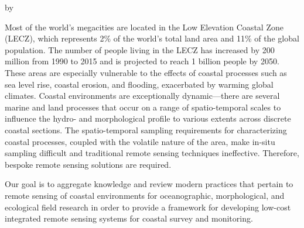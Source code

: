 \documentclass{article}
\begin{document}

\newpage
{}
\thispagestyle{fancy}
\begin{center}
\vspace{1cm}
\par{\thetitle}
\vspace{1cm}
\par{by}
\vspace{1cm}
\par{\theauthor}
\vspace{1cm}
\end{center}
\doublespacing

\par{Most of the world’s megacities are located in the Low Elevation Coastal Zone (LECZ), which represents 2\% of the world’s total land area and 11\% of the global population. The number of people living in the LECZ has increased by 200 million from 1990 to 2015 and is projected to reach 1 billion people by 2050. These areas are especially vulnerable to the effects of coastal processes such as sea level rise, coastal erosion, and flooding, exacerbated by warming global climates. Coastal environments are exceptionally dynamic—there are several marine and land processes that occur on a range of spatio-temporal scales to influence the hydro- and morphological profile to various extents across discrete coastal sections. The spatio-temporal sampling requirements for characterizing coastal processes, coupled with the volatile nature of the area, make in-situ sampling difficult and traditional remote sensing techniques ineffective. Therefore, bespoke remote sensing solutions are required.}

\par{Our goal is to aggregate knowledge and review modern practices that pertain to remote sensing of coastal environments for oceanographic, morphological, and ecological field research in order to provide a framework for developing low-cost integrated remote sensing systems for coastal survey and monitoring.}
\end{document}

